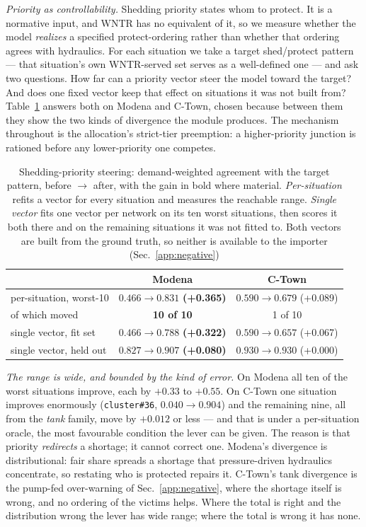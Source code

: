 \documentclass[11pt]{article}
\begin{document}
\emph{Priority as controllability.} Shedding priority states whom to protect. It is a
normative input, and WNTR has no equivalent of it, so we measure whether the model
\emph{realizes} a specified protect-ordering rather than whether that ordering agrees
with hydraulics. For each situation we take a target shed/protect pattern --- that
situation's own WNTR-served set serves as a well-defined one --- and ask two questions.
How far can a priority vector steer the model toward the target? And does one fixed
vector keep that effect on situations it was not built from? Table~\ref{tab:steering}
answers both on Modena and C-Town, chosen because between them they show the two kinds
of divergence the module produces. The mechanism throughout is the allocation's
strict-tier preemption: a higher-priority junction is rationed before any
lower-priority one competes.

\begin{table}[h]
\centering
\caption{Shedding-priority steering: demand-weighted agreement with the target pattern,
before $\to$ after, with the gain in bold where material. \emph{Per-situation} refits a
vector for every situation and measures the reachable range. \emph{Single vector} fits
one vector per network on its ten worst situations, then scores it both there and on
the remaining situations it was not fitted to. Both vectors are built from the ground
truth, so neither is available to the importer (Sec.~\ref{app:negative})}\label{tab:steering}
\small
\begin{tabular}{@{}lcc@{}}
\toprule
 & Modena & C-Town\\
\midrule
per-situation, worst-10     & $0.466 \to 0.831$ \textbf{(+0.365)} & $0.590 \to 0.679$ (+0.089)\\
\quad of which moved        & \textbf{10 of 10} & 1 of 10\\
single vector, fit set      & $0.466 \to 0.788$ \textbf{(+0.322)} & $0.590 \to 0.657$ (+0.067)\\
single vector, held out     & $0.827 \to 0.907$ \textbf{(+0.080)} & $0.930 \to 0.930$ (+0.000)\\
\bottomrule
\end{tabular}
\end{table}

\emph{The range is wide, and bounded by the kind of error.} On Modena all ten of the
worst situations improve, each by $+0.33$ to $+0.55$. On C-Town one situation improves
enormously (\texttt{cluster\#36}, $0.040 \to 0.904$) and the remaining nine, all from
the \emph{tank} family, move by $+0.012$ or less --- and that is under a per-situation
oracle, the most favourable condition the lever can be given. The reason is that
priority \emph{redirects} a shortage; it cannot correct one. Modena's divergence is
distributional: fair share spreads a shortage that pressure-driven hydraulics
concentrate, so restating who is protected repairs it. C-Town's tank divergence is the
pump-fed over-warning of Sec.~\ref{app:negative}, where the shortage itself is wrong,
and no ordering of the victims helps. Where the total is right and the distribution
wrong the lever has wide range; where the total is wrong it has none.
\end{document}
